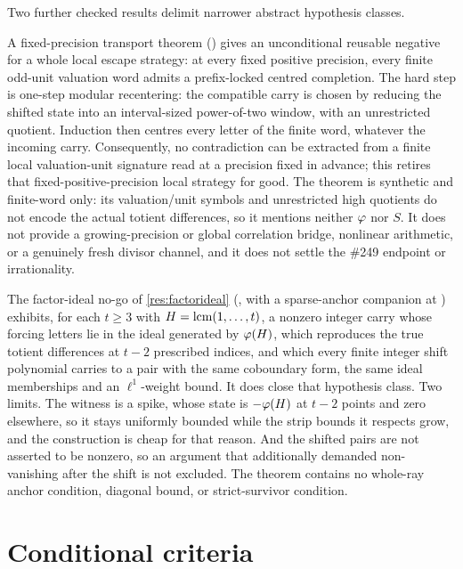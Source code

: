 \documentclass[11pt]{article}
\newcommand{\Stot}{S}
\begin{document}
Two further checked results delimit narrower abstract hypothesis classes.

A fixed-precision transport theorem
()
gives an unconditional reusable negative for a whole local escape strategy:
at every fixed positive precision, every finite odd-unit valuation word admits
a prefix-locked centred completion.  The hard step is one-step modular
recentering: the compatible carry is chosen by reducing the shifted state into
an interval-sized power-of-two window, with an unrestricted quotient.  Induction
then centres every letter of the finite word, whatever the incoming carry.
Consequently, no contradiction can be extracted from a finite local
valuation-unit signature read at a precision fixed in advance; this retires
that fixed-positive-precision local strategy for good.  The theorem is
synthetic and finite-word only: its valuation/unit symbols and unrestricted
high quotients do not encode the actual totient differences, so it mentions
neither $\varphi$ nor $\Stot$.  It does not provide a growing-precision or global
correlation bridge, nonlinear arithmetic, or a genuinely fresh divisor channel,
and it does not settle the \#249 endpoint or irrationality.

The factor-ideal no-go of \ref{res:factorideal}
(,
with a sparse-anchor companion at
)
exhibits, for each $t\ge3$ with $H=\operatorname{lcm}(1,\dots,t)$, a nonzero integer carry
whose forcing letters lie in the ideal generated by $\varphi(H)$, which reproduces
the true totient differences at $t-2$ prescribed indices, and which every
finite integer shift polynomial carries to a pair with the same coboundary
form, the same ideal memberships and an $\ell^1$-weight bound.  It does close
that hypothesis class.  Two limits.  The witness is a spike, whose state is
$-\varphi(H)$ at $t-2$ points and zero elsewhere, so it stays uniformly bounded
while the strip bounds it respects grow, and the construction is cheap for
that reason.  And the shifted pairs are not asserted to be nonzero, so an
argument that additionally demanded non-vanishing after the shift is not
excluded.  The theorem contains no whole-ray anchor condition, diagonal bound,
or strict-survivor condition.

\section{Conditional criteria}\label{sec:conditional-criteria}
\end{document}
